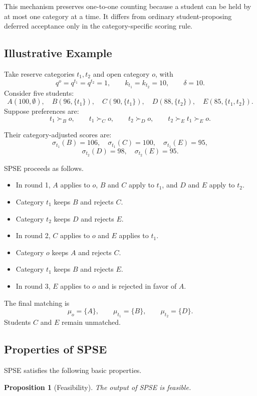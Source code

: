 \documentclass[12pt]{article}
\newtheorem{proposition}{Proposition}
\newcommand{\1}{\mathbf{1}}
\begin{document}
This mechanism preserves one-to-one counting because a student can be held by at most one category at a time. It differs from ordinary student-proposing deferred acceptance only in the category-specific scoring rule.

\subsection{Illustrative Example}

Take reserve categories $t_1,t_2$ and open category $o$, with
\[
q^o=q^{t_1}=q^{t_2}=1,\qquad k_{t_1}=k_{t_2}=10,\qquad \delta=10.
\]
Consider five students:
\[
A(100,\emptyset),\quad B(96,\{t_1\}),\quad C(90,\{t_1\}),\quad D(88,\{t_2\}),\quad E(85,\{t_1,t_2\}).
\]
Suppose preferences are:
\[
t_1\succ_B o,\qquad t_1\succ_C o,\qquad t_2\succ_D o,\qquad t_2\succ_E t_1\succ_E o.
\]

Their category-adjusted scores are:
\[
\sigma_{t_1}(B)=106,\quad \sigma_{t_1}(C)=100,\quad \sigma_{t_1}(E)=95,
\]
\[
\sigma_{t_2}(D)=98,\quad \sigma_{t_2}(E)=95.
\]

SPSE proceeds as follows.

\begin{itemize}
\item In round 1, $A$ applies to $o$, $B$ and $C$ apply to $t_1$, and $D$ and $E$ apply to $t_2$.
\item Category $t_1$ keeps $B$ and rejects $C$.
\item Category $t_2$ keeps $D$ and rejects $E$.
\item In round 2, $C$ applies to $o$ and $E$ applies to $t_1$.
\item Category $o$ keeps $A$ and rejects $C$.
\item Category $t_1$ keeps $B$ and rejects $E$.
\item In round 3, $E$ applies to $o$ and is rejected in favor of $A$.
\end{itemize}

The final matching is
\[
\mu_o=\{A\},\qquad \mu_{t_1}=\{B\},\qquad \mu_{t_2}=\{D\}.
\]
Students $C$ and $E$ remain unmatched.

\subsection{Properties of SPSE}

SPSE satisfies the following basic properties.

\begin{proposition}[Feasibility]
The output of SPSE is feasible.
\end{proposition}
\end{document}
